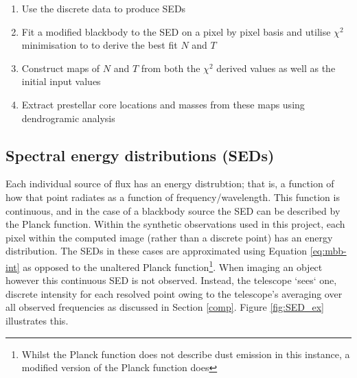 \documentclass{report}
\begin{document}
\begin{enumerate}
  \item Use the discrete data to produce SEDs
  \item Fit a modified blackbody to the SED on a pixel by pixel basis and utilise $\chi^{2}$ minimisation to to derive the best fit $N$ and $T$
  \item Construct maps of $N$ and $T$ from both the $\chi^{2}$ derived values as well as the initial input values
  \item Extract prestellar core locations and masses from these maps using dendrogramic analysis
\end{enumerate}

\subsection{Spectral energy distributions (SEDs)}
Each individual source of flux has an energy distrubtion; that is, a function of how that point radiates as a function of frequency/wavelength. This function is continuous, and in the case of a blackbody source the SED can be described by the Planck function. Within the synthetic observations used in this project, each pixel within the computed image (rather than a discrete point) has an energy distribution. The SEDs in these cases are approximated using Equation \ref{eq:mbb-int} as opposed to the unaltered Planck function\footnote{Whilst the Planck function does not describe dust emission in this instance, a modified version of the Planck function does}. When imaging an object however this continuous SED is not observed. Instead, the telescope `sees` one, discrete intensity for each resolved point owing to the telescope's averaging over all observed frequencies as discussed in Section \ref{comp}. Figure \ref{fig:SED_ex} illustrates this.
\end{document}
